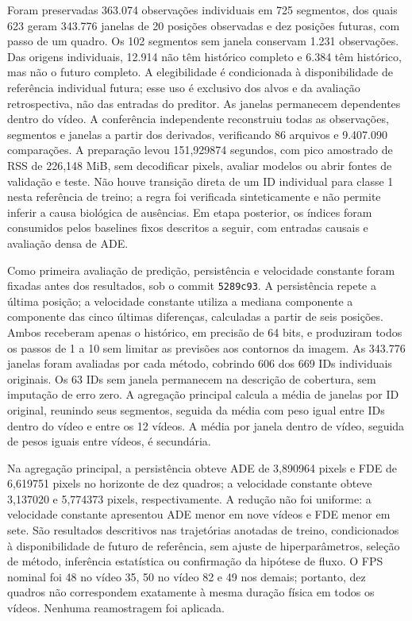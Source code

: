 Foram preservadas 363.074 observações individuais em 725 segmentos, dos quais 623 geram 343.776 janelas de 20 posições observadas e dez posições futuras, com passo de um quadro. Os 102 segmentos sem janela conservam 1.231 observações. Das origens individuais, 12.914 não têm histórico completo e 6.384 têm histórico, mas não o futuro completo. A elegibilidade é condicionada à disponibilidade de referência individual futura; esse uso é exclusivo dos alvos e da avaliação retrospectiva, não das entradas do preditor. As janelas permanecem dependentes dentro do vídeo. A conferência independente reconstruiu todas as observações, segmentos e janelas a partir dos derivados, verificando 86 arquivos e 9.407.090 comparações. A preparação levou 151,929874 segundos, com pico amostrado de RSS de 226,148 MiB, sem decodificar pixels, avaliar modelos ou abrir fontes de validação e teste. Não houve transição direta de um ID individual para classe 1 nesta referência de treino; a regra foi verificada sinteticamente e não permite inferir a causa biológica de ausências. Em etapa posterior, os índices foram consumidos pelos baselines fixos descritos a seguir, com entradas causais e avaliação densa de ADE.


Como primeira avaliação de predição, persistência e velocidade constante foram fixadas antes dos resultados, sob o commit \texttt{5289c93}. A persistência repete a última posição; a velocidade constante utiliza a mediana componente a componente das cinco últimas diferenças, calculadas a partir de seis posições. Ambos receberam apenas o histórico, em precisão de 64 bits, e produziram todos os passos de 1 a 10 sem limitar as previsões aos contornos da imagem. As 343.776 janelas foram avaliadas por cada método, cobrindo 606 dos 669 IDs individuais originais. Os 63 IDs sem janela permanecem na descrição de cobertura, sem imputação de erro zero. A agregação principal calcula a média de janelas por ID original, reunindo seus segmentos, seguida da média com peso igual entre IDs dentro do vídeo e entre os 12 vídeos. A média por janela dentro de vídeo, seguida de pesos iguais entre vídeos, é secundária.

Na agregação principal, a persistência obteve ADE de 3,890964 pixels e FDE de 6,619751 pixels no horizonte de dez quadros; a velocidade constante obteve 3,137020 e 5,774373 pixels, respectivamente. A redução não foi uniforme: a velocidade constante apresentou ADE menor em nove vídeos e FDE menor em sete. São resultados descritivos nas trajetórias anotadas de treino, condicionados à disponibilidade de futuro de referência, sem ajuste de hiperparâmetros, seleção de método, inferência estatística ou confirmação da hipótese de fluxo. O FPS nominal foi 48 no vídeo 35, 50 no vídeo 82 e 49 nos demais; portanto, dez quadros não correspondem exatamente à mesma duração física em todos os vídeos. Nenhuma reamostragem foi aplicada.

